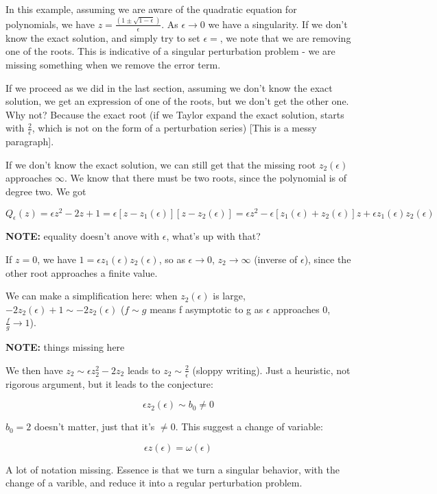 \documentclass[12pt]{report}
\begin{document}
In this example, assuming we are aware of the quadratic equation for
polynomials, we have $z = \frac{(1 \pm
  \sqrt{1-\epsilon})}{\epsilon}$. As $\epsilon \to 0$ we have a
singularity. If we don't know the exact solution, and simply try to
set $\epsilon=$, we note that we are removing one of the roots. This
is indicative of a singular perturbation problem - we are missing
something when we remove the error term.

If we proceed as we did in the last section, assuming we don't know
the exact solution, we get an expression of one of the roots, but we
don't get the other one. Why not? Because the exact root (if we Taylor
expand the exact solution, starts with $\frac 2 \epsilon$, which is
not on the form of a perturbation series) [This is a messy paragraph].

If we don't know the exact solution, we can still get that the missing
root $z_2(\epsilon)$ approaches $\infty$. We know that there must be
two roots, since the polynomial is of degree two. We got

$$Q_\epsilon(z) = \epsilon z^2 - 2z +1 = \epsilon[z - z_1(\epsilon)][z
  - z_2(\epsilon)] = \epsilon z^2 - \epsilon [z_1(\epsilon) +
  z_2(\epsilon)]z + \epsilon z_1(\epsilon)z_2(\epsilon)$$

\textbf{NOTE:} equality doesn't anove with $\epsilon$, what's up with
that?

If $z=0$, we have $1 = \epsilon z_1(\epsilon) z_2(\epsilon)$, so as
$\epsilon \to 0$, $z_2 \to \infty$ (inverse of $\epsilon$), since the
other root approaches a finite value.

We can make a simplification here: when $z_2(\epsilon)$ is large, $-2
z_2(\epsilon) + 1 \sim -2 z_2(\epsilon)$ ($f \sim g$ means f
asymptotic to g as $\epsilon$ approaches 0, $\frac f g \to 1$).

\textbf{NOTE: }things missing here

We then have $z_2 \sim \epsilon z_2^2 - 2 z_2$ leads to $z_2 \sim
\frac 2 \epsilon$ (sloppy writing). Just a heuristic, not rigorous
argument, but it leads to the conjecture:

$$\epsilon z_2(\epsilon) \sim b_0 \neq 0$$

$b_0 = 2$ doesn't matter, just that it's $\neq 0$. This suggest a
change of variable:

$$\epsilon z (\epsilon) = \omega (\epsilon)$$

A lot of notation missing. Essence is that we turn a singular
behavior, with the change of a varible, and reduce it into a regular
perturbation problem.
\end{document}
